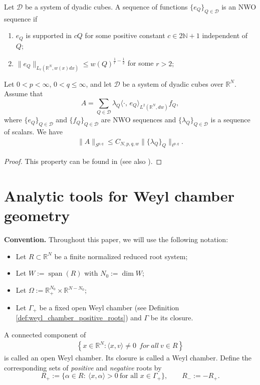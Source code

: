 \documentclass[12pt]{amsart}
\begin{document}
\begin{definition} Let $\mathscr{D}$ be a system of dyadic cubes. A sequence of functions $\{e_Q\}_{Q\in\mathscr{D}}$ is an NWO sequence if
\begin{enumerate}
\item $e_Q$ is supported in $cQ$ for some positive constant $c\in 2\mathbb{N}+1$ independent of $Q;$
\item $\|e_Q\|_{L_r(\mathbb{R}^{N},w(x)dx)}\leq w(Q)^{\frac1r-\frac12}$ for some $r>2;$
\end{enumerate}
\end{definition}

\begin{lemma}\label{NWOLEMMAA2}
Let $0<p<\infty$, $0<q\leq \infty$, and let $\mathscr{D}$ be a
system of dyadic cubes over $\mathbb{R}^N$. Assume that
$$A=\sum_{Q\in\mathscr{D}}\lambda_Q\langle \cdot,\,e_Q\rangle_{L^2(\mathbb{R}^N,dw)} f_Q,$$
where $\{e_Q\}_{Q\in\mathscr{D}}$ and $\{f_Q\}_{Q\in\mathscr{D}}$ are NWO sequences and $\{\lambda_Q\}_{Q\in\mathscr{D}}$ is a sequence of scalars. We have
\begin{align}\label{nwose}
\|A\|_{S^{p,q}}\leq C_{N,p,q,w} \|\{\lambda_Q\}_Q\|_{\ell^{p,q}}.
\end{align}
\end{lemma}
\begin{proof}
This property can be found in  \cite[(1.9)]{RS} (see also \cite[Section 7]{HKarxiv}).
\end{proof}

\section{Analytic tools for Weyl chamber geometry}
\setcounter{equation}{0}

{\bf Convention. }
Throughout this paper, we will use the following notation:
\begin{itemize}
  \item Let $R
  \subset \mathbb{R}^{N}$ be a finite normalized reduced root system;
  \item Let
$W:=\operatorname{span}(R)$ with $N_{0}:=\dim W$;
\item Let
$
  \Omega:=\mathbb{R}_+^{N_{0}}\times \mathbb{R}^{N-N_{0}};
$
\item Let $\Gamma_+$ be a fixed open Weyl chamber (see Definition \ref{def:weyl_chamber_positive_roots}) and $\Gamma$ be its closure.
\end{itemize}


\begin{definition}{\rm \cite[Definition ~2.7]{HeckmanCoxeterGroups}}\label{def:weyl_chamber_positive_roots} A connected component of \begin{align}
    \left\{x\in\mathbb{R}^N:\langle x,v\rangle \neq 0\ \ { for} \ { all} \ v\in R\right\}
  \end{align} is called an open
Weyl chamber. Its closure is called a Weyl chamber.  Define the corresponding sets of \emph{positive} and \emph{negative} roots by
\[
R_{+}:=\{\alpha\in R:\ \langle x,\alpha\rangle>0\ \text{for all }x\in \Gamma_{+}\},
\qquad
R_{-}:=-R_{+}.
\]
\end{definition}
\end{document}
